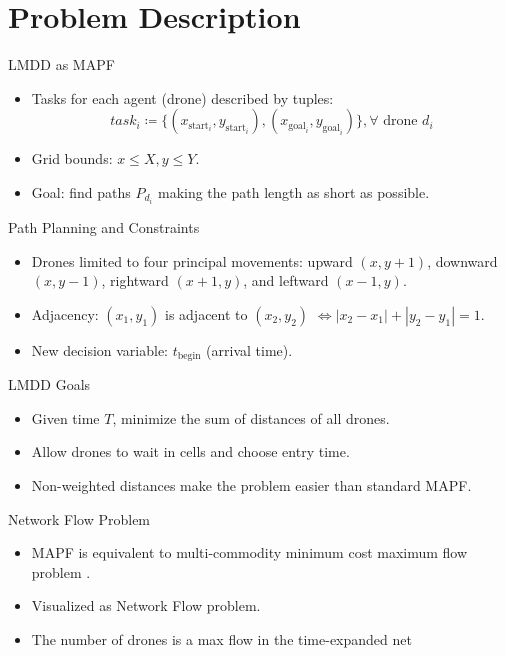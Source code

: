 \section{Problem Description}

\begin{frame}{LMDD as MAPF}
    \begin{itemize}
        \item Tasks for each agent (drone) described by tuples:
        \[
        task_i \coloneq \{(x_{\text{start}_i}, y_{\text{start}_i}) , (x_{\text{goal}_i}, y_{\text{goal}_i})\}, \forall \text{ drone } d_i
        \]
        \item Grid bounds: $x \leq X, y \leq Y$.
        \item Goal: find paths $P_{d_i}$ making the path length as short as possible.
    \end{itemize}
\end{frame}

\begin{frame}{Path Planning and Constraints}
    \begin{itemize}
        \item Drones limited to four principal movements: upward $(x, y+1)$, downward $(x, y-1)$, rightward $(x+1, y)$, and leftward $(x-1, y)$.
        \item Adjacency: $(x_1,y_1)$ is adjacent to $(x_2,y_2)$ $\iff |x_2-x_1| + |y_2-y_1| = 1$.
        \item New decision variable: $t_{\text{begin}}$ (arrival time).
    \end{itemize}
\end{frame}

\begin{frame}{LMDD Goals}
    \begin{itemize}
        \item Given time $T$, minimize the sum of distances of all drones.
        \item Allow drones to wait in cells and choose entry time.
        \item Non-weighted distances make the problem easier than standard MAPF.
    \end{itemize}
\end{frame}

\begin{frame}{Network Flow Problem}
    \begin{itemize}
        \item MAPF is equivalent to multi-commodity minimum cost maximum flow problem \cite{lavalle}.
        \item Visualized as Network Flow problem.
        \item The number of drones is a max flow in the time-expanded net
    \end{itemize}
\end{frame}



